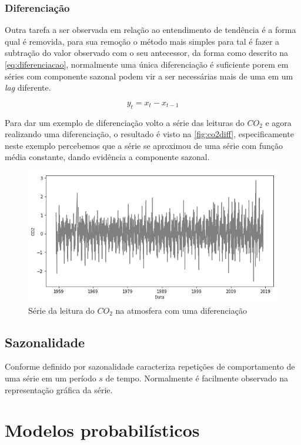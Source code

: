 \documentclass[
    12pt,
    oneside,
    a4paper,
    english,
    brazil
]{abntex2}
\begin{document}
\subsubsection{Diferenciação}\label{sec:diff}

Outra tarefa a ser observada em relação ao entendimento de tendência é a forma
qual é removida, para sua remoção o método mais simples para tal é fazer a
subtração do valor observado com o seu antecessor, da forma como descrito na
\autoref{eq:diferenciacao}, normalmente uma única diferenciação é suficiente
porem em séries com componente sazonal podem vir a ser necessárias mais de uma
em um \textit{lag} diferente.

\begin{equation}
    \label{eq:diferenciacao}
    y_t = x_t - x_{t-1}
\end{equation}

Para dar um exemplo de diferenciação volto a série das leituras do $CO_2$ e
agora realizando uma diferenciação, o resultado é visto na
\autoref{fig:co2diff}, especificamente neste exemplo percebemos que a série se
aproximou de uma série com função média constante, dando evidência a componente
sazonal.

\begin{figure}
    \centering
    \caption{Série da leitura do $CO_2$ na atmosfera com uma
        diferenciação}\label{fig:co2diff}
    \includegraphics[width=.6\linewidth]{images/co2_diff.png}
\end{figure}

\subsection{Sazonalidade}

Conforme definido por  sazonalidade caracteriza repetições
de comportamento de uma série em um período $s$ de tempo. Normalmente é
facilmente observado na representação gráfica da série.

\section{Modelos probabilísticos}
\end{document}
